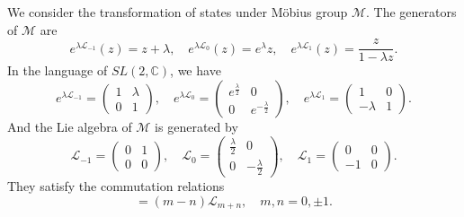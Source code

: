 \documentclass[10pt,reqno,draft]{article}
\numberwithin{equation}{section}
\numberwithin{figure}{section}
\numberwithin{table}{section}
\theoremstyle{plain}
\theoremstyle{definition}
\theoremstyle{remark}
\begin{document}
	We consider the transformation of states under M\"{o}bius group \(\mathcal{M}\). The generators of \(\mathcal{M}\) are 
	\begin{equation}
	  e^{\lambda\mathcal{L}_{-1}}(z)=z+\lambda,\quad e^{\lambda\mathcal{L}_{0}}(z)=e^{\lambda}z,\quad e^{\lambda\mathcal{L}_{1}}(z)=\frac{z}{1-\lambda z}.
	\end{equation}
	In the language of \(SL(2,\mathbb{C})\), we have 
	\begin{equation}
	  e^{\lambda\mathcal{L}_{-1}}=\begin{pmatrix}
	    1 & \lambda\\
	    0 & 1
	  \end{pmatrix},\quad e^{\lambda\mathcal{L}_{0}}=\begin{pmatrix}
	    e^{\frac{\lambda}{2}} &0\\
	    0 & e^{-\frac{\lambda}{2}}
	  \end{pmatrix},\quad e^{\lambda\mathcal{L}_{1}}=\begin{pmatrix}
	    1&0\\
	    -\lambda&1
	  \end{pmatrix} .
	\end{equation}
	And the Lie algebra of \(\mathcal{M}\) is generated by 
	\begin{equation}
	  \mathcal{L}_{-1}=\begin{pmatrix}
	    0 & 1\\
	    0 & 0
	  \end{pmatrix} ,\quad\mathcal{L}_{0}=\begin{pmatrix}
	    \frac{\lambda}{2} & 0\\
	    0 & -\frac{\lambda}{2}
	  \end{pmatrix} ,\quad\mathcal{L}_{1}=\begin{pmatrix}
	    0 & 0\\
	    -1 & 0
	  \end{pmatrix} .
	\end{equation}
	They satisfy the commutation relations
	\begin{equation}
	  [\mathcal{L}_{m},\mathcal{L}_{n}]=(m-n)\mathcal{L}_{m+n},\quad m,n=0,\pm 1. 
	\end{equation}
	
\end{document}
